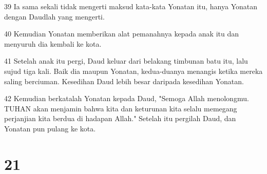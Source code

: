 \par 39 Ia sama sekali tidak mengerti maksud kata-kata Yonatan itu, hanya Yonatan dengan Daudlah yang mengerti.
\par 40 Kemudian Yonatan memberikan alat pemanahnya kepada anak itu dan menyuruh dia kembali ke kota.
\par 41 Setelah anak itu pergi, Daud keluar dari belakang timbunan batu itu, lalu sujud tiga kali. Baik dia maupun Yonatan, kedua-duanya menangis ketika mereka saling berciuman. Kesedihan Daud lebih besar daripada kesedihan Yonatan.
\par 42 Kemudian berkatalah Yonatan kepada Daud, "Semoga Allah menolongmu. TUHAN akan menjamin bahwa kita dan keturunan kita selalu memegang perjanjian kita berdua di hadapan Allah." Setelah itu pergilah Daud, dan Yonatan pun pulang ke kota.

\chapter{21}

